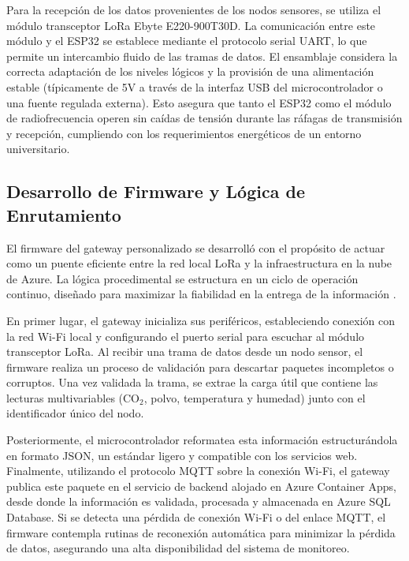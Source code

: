 Para la recepción de los datos provenientes de los nodos sensores, se utiliza el módulo transceptor LoRa Ebyte E220-900T30D. La comunicación entre este módulo y el ESP32 se establece mediante el protocolo serial UART, lo que permite un intercambio fluido de las tramas de datos. El ensamblaje considera la correcta adaptación de los niveles lógicos y la provisión de una alimentación estable (típicamente de 5V a través de la interfaz USB del microcontrolador o una fuente regulada externa). Esto asegura que tanto el ESP32 como el módulo de radiofrecuencia operen sin caídas de tensión durante las ráfagas de transmisión y recepción, cumpliendo con los requerimientos energéticos de un entorno universitario.

\subsection{Desarrollo de Firmware y Lógica de Enrutamiento}

El firmware del gateway personalizado se desarrolló con el propósito de actuar como un puente eficiente entre la red local LoRa y la infraestructura en la nube de Azure. La lógica procedimental se estructura en un ciclo de operación continuo, diseñado para maximizar la fiabilidad en la entrega de la información \cite{nb_gateway_custom_7}.

En primer lugar, el gateway inicializa sus periféricos, estableciendo conexión con la red Wi-Fi local y configurando el puerto serial para escuchar al módulo transceptor LoRa. Al recibir una trama de datos desde un nodo sensor, el firmware realiza un proceso de validación para descartar paquetes incompletos o corruptos. Una vez validada la trama, se extrae la carga útil que contiene las lecturas multivariables (CO\(_2\), polvo, temperatura y humedad) junto con el identificador único del nodo.

Posteriormente, el microcontrolador reformatea esta información estructurándola en formato JSON, un estándar ligero y compatible con los servicios web. Finalmente, utilizando el protocolo MQTT sobre la conexión Wi-Fi, el gateway publica este paquete en el servicio de backend alojado en Azure Container Apps, desde donde la información es validada, procesada y almacenada en Azure SQL Database. Si se detecta una pérdida de conexión Wi-Fi o del enlace MQTT, el firmware contempla rutinas de reconexión automática para minimizar la pérdida de datos, asegurando una alta disponibilidad del sistema de monitoreo.




